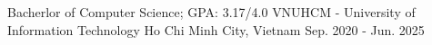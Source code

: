

\begin{cventries}

  \cventry
    {Bacherlor of Computer Science; GPA: 3.17/4.0} %
    {VNUHCM - University of Information Technology} %
    {Ho Chi Minh City, Vietnam} %
    {Sep. 2020 - Jun. 2025} %
    {}
    \vspace{-0.8cm}
\end{cventries}
